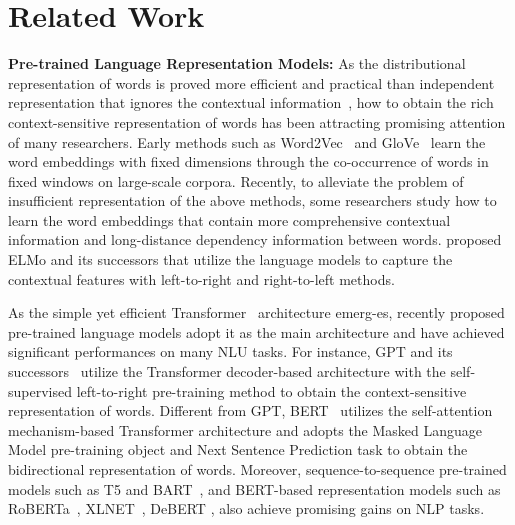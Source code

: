 \section{Related Work}


\textbf{Pre-trained Language Representation Models:} As the distributional representation of words is proved more efficient and practical than independent representation that ignores the contextual information~\cite{sahlgren2008distributional}, how to obtain the rich context-sensitive representation of words has been attracting promising attention of many researchers. Early methods such as Word2Vec~\cite{word2vec} and GloVe~\cite{pennington-etal-2014-glove} learn the word embeddings with fixed dimensions through the co-occurrence of words in fixed windows on large-scale corpora. Recently, to alleviate the problem of insufficient representation of the above methods, some researchers study how to learn the word embeddings that contain more comprehensive contextual information and long-distance dependency information between words. \citet{elmo, elmo_b} proposed ELMo and its successors that utilize the language models to capture the contextual features with left-to-right and right-to-left methods. 

As the simple yet efficient Transformer~\cite{attention} architecture emerg-es, recently proposed pre-trained language models adopt it as the main architecture and have achieved significant performances on many NLU tasks. For instance, GPT and its successors~\cite{gpt,radford2019language_gpt_2, gpt_3} utilize the Transformer decoder-based architecture with the self-supervised left-to-right pre-training method to obtain the context-sensitive representation of words. Different from GPT, BERT~\cite{devlin-etal-2019-bert} utilizes the self-attention mechanism-based Transformer architecture and adopts the Masked Language Model pre-training object and Next Sentence Prediction task to obtain the bidirectional representation of words. Moreover, sequence-to-sequence pre-trained models such as T5 \cite{T5} and BART~\cite{lewis-etal-2020-bart}, and BERT-based representation models such as RoBERTa~\cite{liu2019roberta}, XLNET~\cite{xlnet}, DeBERT \cite{debert}, also achieve promising gains on NLP tasks.

